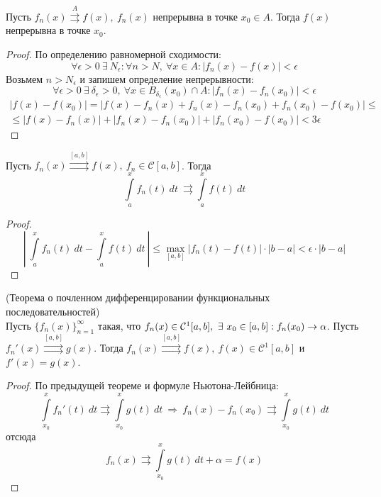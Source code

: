 \begin{theorem}
    Пусть $f_n(x)\overset{A}{\rightrightarrows} f(x),\ f_n(x)$ непрерывна в точке $x_0\in A$. Тогда $f(x)$ непрерывна в точке $x_0$.
\end{theorem}
\begin{proof}
    По определению равномерной сходимости:
    \[\forall \epsilon>0\ \exists\ N_{\epsilon}: \forall n>N,\ \forall x\in A: |f_n(x)-f(x)|<\epsilon\]
    Возьмем $n>N_{\epsilon}$ и запишем определение непрерывности:
    \[\forall \epsilon>0\ \exists\ \delta_{\epsilon}>0,\ \forall x\in B_{\delta_{\epsilon}}(x_0)\cap A: |f_n(x)-f_n(x_0)|<\epsilon\]
    \begin{multline*}
        |f(x)-f(x_0)|=|f(x)-f_n(x)+f_n(x)-f_n(x_0)+f_n(x_0)-f(x_0)|\leq\\
        \leq |f(x)-f_n(x)|+|f_n(x)-f_n(x_0)|+|f_n(x_0)-f(x_0)|<3\epsilon
    \end{multline*}
\end{proof}
\begin{theorem}
    Пусть $f_n(x)\overset{[a,b]}{\rightrightarrows} f(x),\ f_n\in \mathcal{C}[a,b]$. Тогда 
    \[\int\limits_{a}^{x}f_n(t)\ dt\ \rightrightarrows \int\limits_{a}^{x}f(t)\ dt\]
\end{theorem}
\begin{proof}
        \[\left|\ \int\limits_{a}^{x}f_n(t)\ dt-\int\limits_{a}^{x}f(t)\ dt\ \right|\leq \max\limits_{[a,b]}|f_n(t)-f(t)|\cdot |b-a|<\epsilon\cdot |b-a|\]
\end{proof}
\begin{theorem} (Теорема о почленном дифференцировании функциональных последовательностей)\\
    Пусть $\{f_n(x)\}_{n=1}^{\infty}$ такая, что $f_n(x)\in \mathcal{C}^1[a,b],\ \exists\ x_0\in [a,b]:
    \vspace{7pt}\\
    f_n(x_0)\to \alpha$. Пусть $f_n'(x)\overset{[a,b]}\rightrightarrows g(x)$. Тогда $f_n(x)\overset{[a,b]}\rightrightarrows f(x),\ f(x)\in \mathcal{C}^1[a,b]$ и\\
    $f'(x)=g(x)$.
\end{theorem}
\begin{proof} По предыдущей теореме и формуле Ньютона-Лейбница:
    \[\int\limits_{x_0}^{x}f_n'(t)\ dt\rightrightarrows \int\limits_{x_0}^{x}g(t)\ dt\ \Rightarrow\ f_n(x)-f_n(x_0) \rightrightarrows \int\limits_{x_0}^{x}g(t)\ dt\]
    отсюда
    \[f_n(x)\rightrightarrows \int\limits_{x_0}^{x}g(t)\ dt+\alpha=f(x)\]
\end{proof}
